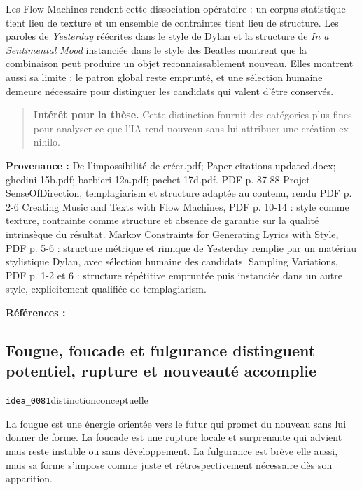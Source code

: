 \documentclass[10pt,a4paper]{article}
\begin{document}
Les Flow Machines rendent cette dissociation opératoire : un corpus statistique tient lieu de texture et un ensemble de contraintes tient lieu de structure. Les paroles de \emph{Yesterday} réécrites dans le style de Dylan et la structure de \emph{In a Sentimental Mood} instanciée dans le style des Beatles montrent que la combinaison peut produire un objet reconnaissablement nouveau. Elles montrent aussi sa limite : le patron global reste emprunté, et une sélection humaine demeure nécessaire pour distinguer les candidats qui valent d'être conservés.

\begin{quote}
\textbf{Intérêt pour la thèse.} Cette distinction fournit des catégories plus fines pour analyser ce que l'IA rend nouveau sans lui attribuer une création ex nihilo.
\end{quote}
{\footnotesize\color{metadata}\textbf{Provenance :} De l'impossibilité de créer.pdf; Paper citations updated.docx; ghedini-15b.pdf; barbieri-12a.pdf; pachet-17d.pdf. PDF p. 87-88 Projet SenseOfDirection, templagiarism et structure adaptée au contenu, rendu PDF p. 2-6 Creating Music and Texts with Flow Machines, PDF p. 10-14 : style comme texture, contrainte comme structure et absence de garantie sur la qualité intrinsèque du résultat. Markov Constraints for Generating Lyrics with Style, PDF p. 5-6 : structure métrique et rimique de Yesterday remplie par un matériau stylistique Dylan, avec sélection humaine des candidats. Sampling Variations, PDF p. 1-2 et 6 : structure répétitive empruntée puis instanciée dans un autre style, explicitement qualifiée de templagiarism.\par}
{\footnotesize\color{metadata}\textbf{Références :} \parencite{ghedini2015flowmachines,barbieri2012lyrics,pachet2017variations}\par}

\subsection{Fougue, foucade et fulgurance distinguent potentiel, rupture et nouveauté accomplie}
{\small\color{metadata} \texttt{idea\_0081}\quad\textbullet\quad distinction\quad\textbullet\quad conceptuelle\par}

La fougue est une énergie orientée vers le futur qui promet du nouveau sans lui donner de forme. La foucade est une rupture locale et surprenante qui advient mais reste instable ou sans développement. La fulgurance est brève elle aussi, mais sa forme s'impose comme juste et rétrospectivement nécessaire dès son apparition.
\end{document}
